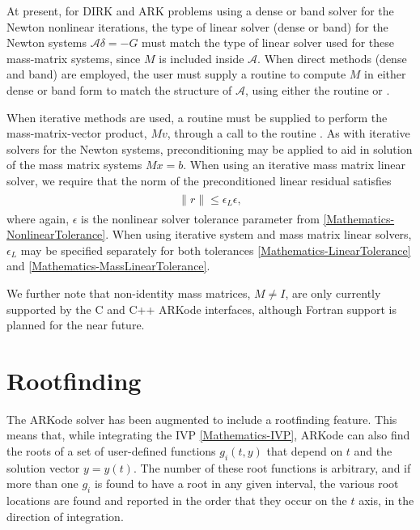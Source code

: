 \documentclass[letterpaper,10pt,english]{sphinxmanual}
\begin{document}
At present, for DIRK and ARK problems using a dense or band solver for
the Newton nonlinear iterations, the type of linear solver (dense or
band) for the Newton systems \({\mathcal A}\delta = -G\) must
match the type of linear solver used for these mass-matrix systems,
since \(M\) is included inside \({\mathcal A}\).  When direct
methods (dense and band) are employed, the user must supply a routine
to compute \(M\) in either dense or band form to match the
structure of \({\mathcal A}\), using either the routine
{\hyperref[c_interface/User_supplied:c.ARKDlsDenseMassFn]{\emph{}}} or {\hyperref[c_interface/User_supplied:c.ARKDlsBandMassFn]{\emph{}}}.

When iterative methods are used, a routine must be supplied to perform
the mass-matrix-vector product, \(Mv\), through a call to the
routine {\hyperref[c_interface/User_supplied:c.ARKSpilsMassTimesVecFn]{\emph{}}}.  As with iterative solvers
for the Newton systems, preconditioning may be applied to aid in
solution of the mass matrix systems \(Mx=b\).  When using an
iterative mass matrix linear solver, we require that the norm of the
preconditioned linear residual satisfies
\label{Mathematics:equation-MassLinearTolerance}\begin{gather}
\begin{split}\|r\| \le \epsilon_L \epsilon,\end{split}\label{Mathematics-MassLinearTolerance}
\end{gather}
where again, \(\epsilon\) is the nonlinear solver tolerance
parameter from \eqref{Mathematics-NonlinearTolerance}.  When using iterative system
and mass matrix linear solvers, \(\epsilon_L\) may be specified
separately for both tolerances \eqref{Mathematics-LinearTolerance} and
\eqref{Mathematics-MassLinearTolerance}.

We further note that non-identity mass matrices, \(M\ne I\), are
only currently supported by the C and C++ ARKode interfaces, although
Fortran support is planned for the near future.


\section{Rootfinding}
\label{Mathematics:mathematics-rootfinding}\label{Mathematics:rootfinding}
The ARKode solver has been augmented to include a rootfinding
feature. This means that, while integrating the IVP \eqref{Mathematics-IVP}, ARKode
can also find the roots of a set of user-defined functions
\(g_i(t,y)\) that depend on \(t\) and the solution vector
\(y = y(t)\). The number of these root functions is arbitrary, and
if more than one \(g_i\) is found to have a root in any given
interval, the various root locations are found and reported in the
order that they occur on the \(t\) axis, in the direction of
integration.
\end{document}
